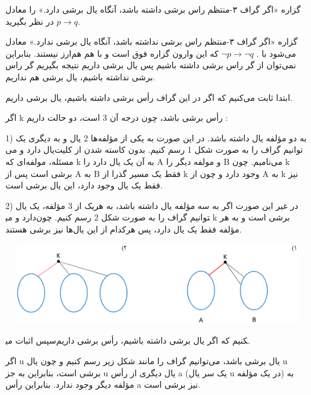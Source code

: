 \documentclass[11pt,largemargins]{h2wp}
\begin{document}
 
 گزاره «اگر گراف ۳-منتظم راس برشی داشته باشد، آنگاه یال برشی دارد.» را معادل $p \rightarrow q $ در نظر بگیرید.
 
 گزاره «اگر گراف ۳-منتظم راس برشی نداشته باشد، آنگاه یال برشی ندارد.» معادل می‌شود با
 . $ \neg p \rightarrow \neg q $ 
 که این وارون گزاره فوق است و با هم هم‌ارز نیستند.
 بنابراین نمی‌توان از گر راس برشی داشته باشیم پس یال برشی داریم نتیجه بگیریم گر راس برشی نداشته باشیم، یال برشی هم نداریم. 
 
    ابتدا ثابت می‌کنیم که اگر در این گراف رأس برشی داشته باشیم، یال برشی داریم.
    
    اگر k رأس برشی باشد، چون درجه آن 3 است، دو حالت داریم : 
    
    1)	به دو مؤلفه یال داشته باشد. در این صورت به یکی از مؤلفه‌ها 2 یال و به دیگری یک یال دارد و می‎‌توانیم گراف را به صورت شکل 1 رسم کنیم. بدون کاسته شدن از کلیت مسئله، مولفه‌ای که k به آن یک یال دارد را A و مولفه دیگر را B می‌نامیم. چون k برشی است پس از A به B فقط یک مسیر گذرا از k وجود دارد و چون از A به k نیز فقط یک یال وجود دارد، این یال برشی است.
    
    2)	در غیر این صورت اگر به سه مؤلفه یال داشته باشد، به هریک از 3 مؤلفه، یک یال دارد و می‎توانیم گراف را به صورت شکل 2 رسم کنیم. چون k برشی است و به هر مؤلفه فقط یک یال دارد، پس هرکدام از این یال‌ها نیز برشی هستند. 
    
    
    
    \includegraphics[width=15cm, height=3.5cm]{1.png}
   
   
    سپس اثبات می‎کنیم که اگر یال برشی داشته باشیم، رأس برشی داریم.
    
    اگر u یال برشی باشد، می‌توانیم گراف را مانند شکل زیر رسم کنیم و چون یال u برشی است، بنابراین به جز u یال دیگری از رأس a (یک سر یال u در یک مؤلفه) به مؤلفه دیگر وجود ندارد. بنابراین رأس a نیز برشی است.
    
\end{document}
